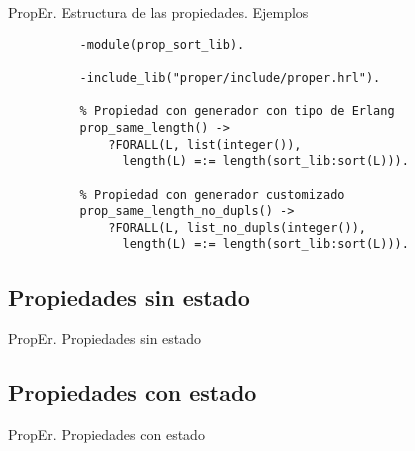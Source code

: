 \documentclass{beamer}
\begin{document}
      \begin{frame}[fragile]{PropEr. Estructura de las propiedades. Ejemplos}
        \begin{verbatim}
          -module(prop_sort_lib).

          -include_lib("proper/include/proper.hrl").

          % Propiedad con generador con tipo de Erlang
          prop_same_length() ->
              ?FORALL(L, list(integer()),
                length(L) =:= length(sort_lib:sort(L))).

          % Propiedad con generador customizado
          prop_same_length_no_dupls() ->
              ?FORALL(L, list_no_dupls(integer()),
                length(L) =:= length(sort_lib:sort(L))).
        \end{verbatim}
      \end{frame}


    \subsection{Propiedades sin estado}
      \begin{frame}{PropEr. Propiedades sin estado}
      \end{frame}
    \subsection{Propiedades con estado}
      \begin{frame}{PropEr. Propiedades con estado}
      \end{frame}
\end{document}
